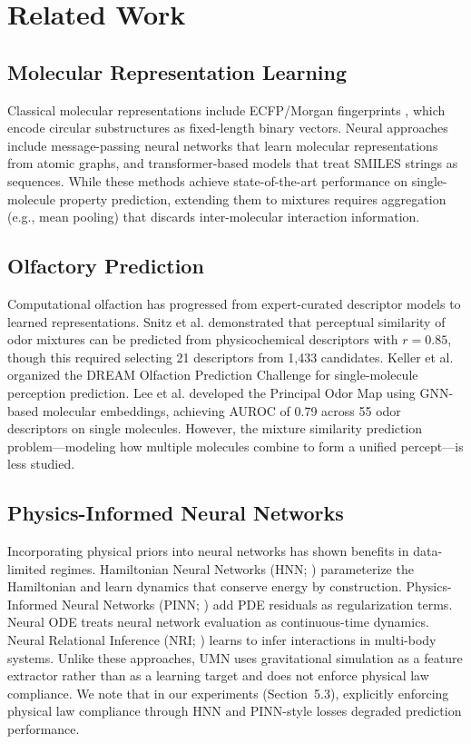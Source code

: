 \documentclass[11pt,a4paper]{article}
\begin{document}
\section{Related Work}

\subsection{Molecular Representation Learning}
Classical molecular representations include ECFP/Morgan fingerprints \cite{rogers2010}, which encode circular substructures as fixed-length binary vectors. Neural approaches include message-passing neural networks \cite{gilmer2017} that learn molecular representations from atomic graphs, and transformer-based models that treat SMILES strings as sequences. While these methods achieve state-of-the-art performance on single-molecule property prediction, extending them to mixtures requires aggregation (e.g., mean pooling) that discards inter-molecular interaction information.

\subsection{Olfactory Prediction}
Computational olfaction has progressed from expert-curated descriptor models to learned representations. Snitz et al. \cite{snitz2013} demonstrated that perceptual similarity of odor mixtures can be predicted from physicochemical descriptors with $r = 0.85$, though this required selecting 21 descriptors from 1,433 candidates. Keller et al. \cite{keller2017} organized the DREAM Olfaction Prediction Challenge for single-molecule perception prediction. Lee et al. \cite{lee2023} developed the Principal Odor Map using GNN-based molecular embeddings, achieving AUROC of 0.79 across 55 odor descriptors on single molecules. However, the mixture similarity prediction problem---modeling how multiple molecules combine to form a unified percept---is less studied.

\subsection{Physics-Informed Neural Networks}
Incorporating physical priors into neural networks has shown benefits in data-limited regimes. Hamiltonian Neural Networks (HNN; \cite{greydanus2019}) parameterize the Hamiltonian and learn dynamics that conserve energy by construction. Physics-Informed Neural Networks (PINN; \cite{raissi2019}) add PDE residuals as regularization terms. Neural ODE \cite{chen2018} treats neural network evaluation as continuous-time dynamics. Neural Relational Inference (NRI; \cite{kipf2018}) learns to infer interactions in multi-body systems. Unlike these approaches, UMN uses gravitational simulation as a feature extractor rather than as a learning target and does not enforce physical law compliance. We note that in our experiments (Section~5.3), explicitly enforcing physical law compliance through HNN and PINN-style losses degraded prediction performance.
\end{document}
